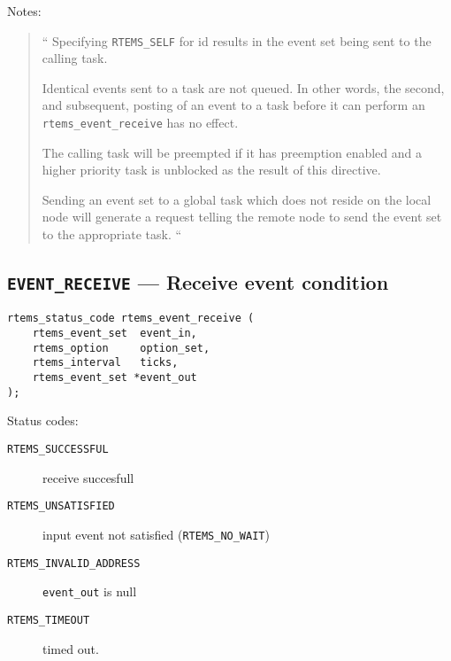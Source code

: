 Notes:
\begin{quote}
``
Specifying \texttt{RTEMS\_SELF} for id results in the event set being sent
to the calling task.
\par
Identical events sent to a task are not queued.
In other words, the second, and subsequent,
posting of an event to a task
before it can perform an \texttt{rtems\_event\_receive} has no effect.
\par
The calling task will be preempted if it has preemption enabled
and a higher priority task is unblocked as the result of this directive.
\par
Sending an event set to a global task
which does not reside on the local node
will generate a request
telling the remote node to send the event set to the appropriate task.
``
\end{quote}

\newpage
\subsection{\texttt{EVENT\_RECEIVE} --- Receive event condition}

\begin{verbatim}
rtems_status_code rtems_event_receive (
    rtems_event_set  event_in,
    rtems_option     option_set,
    rtems_interval   ticks,
    rtems_event_set *event_out
);
\end{verbatim}

Status codes:
\begin{description}
  \item [\texttt{RTEMS\_SUCCESSFUL}] receive succesfull
  \item [\texttt{RTEMS\_UNSATISFIED}]
     input event not satisfied
     (\texttt{RTEMS\_NO\_WAIT})
  \item [\texttt{RTEMS\_INVALID\_ADDRESS}] \texttt{event\_out} is null
    \item [\texttt{RTEMS\_TIMEOUT}] timed out.
\end{description}

